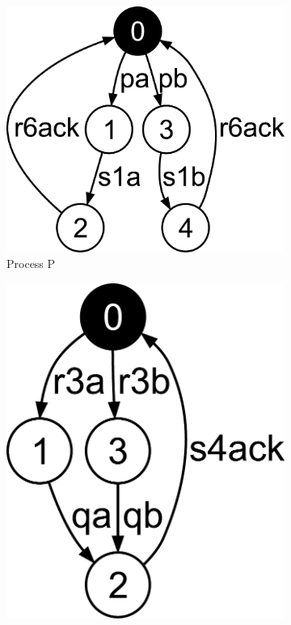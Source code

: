 \begin{figure}[hbt]
  \begin{subfigure}[b]{130pt}
    \centering
    \includegraphics[scale=0.2]{prop-pres-case-studies/figs/abp-P}
    \caption{Process P}
  \end{subfigure}
  \hfill
  \begin{subfigure}[b]{100pt}
    \centering
    \includegraphics[scale=0.2]{prop-pres-case-studies/figs/abp-Q}

\end{subfigure}
\end{figure}
